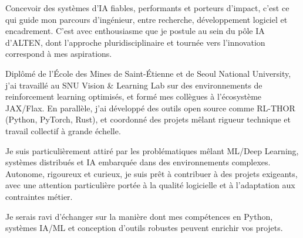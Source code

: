 
\newcommand{\Company}{Alten}
\recipient{\RecruitmentTeam{\Company}}{\Company\\Toulouse\\ France}
\date{}
\makelettertitle{}

Concevoir des systèmes d'IA fiables, performants et porteurs d'impact, c'est ce qui guide mon parcours d'ingénieur, entre recherche, développement logiciel et encadrement. C'est avec enthousiasme que je postule au sein du pôle IA d'ALTEN, dont l'approche pluridisciplinaire et tournée vers l'innovation correspond à mes aspirations.

Diplômé de l'École des Mines de Saint-Étienne et de Seoul National University, j'ai travaillé au SNU Vision \& Learning Lab sur des environnements de reinforcement learning optimisés, et formé mes collègues à l'écosystème JAX/Flax. En parallèle, j'ai développé des outils open source comme RL-THOR (Python, PyTorch, Rust), et coordonné des projets mêlant rigueur technique et travail collectif à grande échelle.

Je suis particulièrement attiré par les problématiques mêlant ML/Deep Learning, systèmes distribués et IA embarquée dans des environnements complexes. Autonome, rigoureux et curieux, je suis prêt à contribuer à des projets exigeants, avec une attention particulière portée à la qualité logicielle et à l'adaptation aux contraintes métier.

Je serais ravi d'échanger sur la manière dont mes compétences en Python, systèmes IA/ML et conception d'outils robustes peuvent enrichir vos projets.

\makeletterclosing
